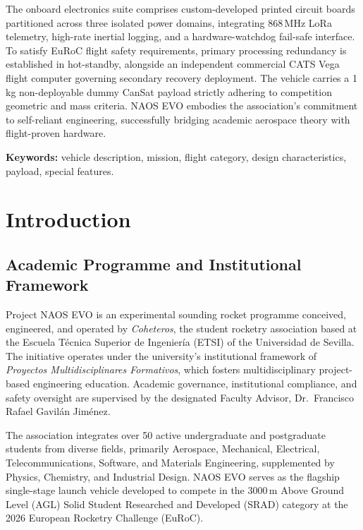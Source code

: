 \documentclass[11pt, a4paper]{article} %
\begin{document}
The onboard electronics suite comprises custom-developed printed circuit boards partitioned across three isolated power domains, integrating 868\,MHz LoRa telemetry, high-rate inertial logging, and a hardware-watchdog fail-safe interface. To satisfy EuRoC flight safety requirements, primary processing redundancy is established in hot-standby, alongside an independent commercial CATS Vega flight computer governing secondary recovery deployment. The vehicle carries a 1\,kg non-deployable dummy CanSat payload strictly adhering to competition geometric and mass criteria. NAOS EVO embodies the association's commitment to self-reliant engineering, successfully bridging academic aerospace theory with flight-proven hardware.

\vspace{0.6cm}
\noindent\textbf{Keywords:} vehicle description, mission, flight category, design characteristics, payload, special features.

\newpage

\section{Introduction}
\label{sec:introduction}

\subsection{Academic Programme and Institutional Framework}
Project NAOS EVO is an experimental sounding rocket programme conceived, engineered, and operated by \textit{Coheteros}, the student rocketry association based at the Escuela Técnica Superior de Ingeniería (ETSI) of the Universidad de Sevilla. The initiative operates under the university's institutional framework of \textit{Proyectos Multidisciplinares Formativos}, which fosters multidisciplinary project-based engineering education. Academic governance, institutional compliance, and safety oversight are supervised by the designated Faculty Advisor, Dr.~Francisco Rafael Gavilán Jiménez. 

The association integrates over 50 active undergraduate and postgraduate students from diverse fields, primarily Aerospace, Mechanical, Electrical, Telecommunications, Software, and Materials Engineering, supplemented by Physics, Chemistry, and Industrial Design. NAOS EVO serves as the flagship single-stage launch vehicle developed to compete in the 3000\,m Above Ground Level (AGL) Solid Student Researched and Developed (SRAD) category at the 2026 European Rocketry Challenge (EuRoC).
\end{document}
